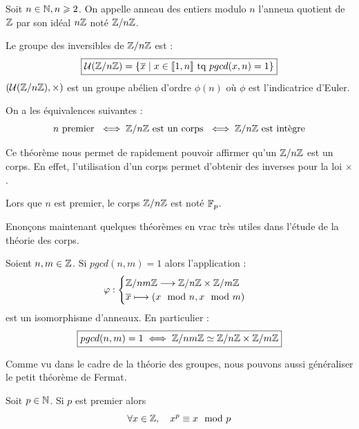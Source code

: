 \begin{definition}[Anneau $\Z / n \Z$]
    Soit $n \in \mathbb{N}, n \geqslant 2$. On appelle anneau des entiers modulo $n$ l'anneua quotient de $\mathbb{Z}$ 
    par son idéal $n\mathbb{Z}$ noté $\Z /n \Z$. 
\end{definition}

\begin{theorem}
    Le groupe des inversibles de $\Z / n \Z$ est : 
        \[ \boxed{ \mathcal{U}(\mathbb{Z} / n \mathbb{Z}) = \{ \overline{x} \; | \; x \in \llbracket 1, n \rrbracket \text{ tq } pgcd(x,n) = 1\} } \] 
    $(\mathcal{U}(\mathbb{Z} / n \mathbb{Z}), \times)$ est un groupe abélien d'ordre $\phi(n)$ où $\phi$ est l'indicatrice d'Euler. 
\end{theorem}

\begin{theorem}[Fondamental]
    On a les équivalences suivantes : 
        \[ n \text{ premier } \iff \mathbb{Z} / n \mathbb{Z} \text{ est un corps } \iff \mathbb{Z} / n \mathbb{Z} \text{ est intègre} \] 
\end{theorem}

Ce théorème nous permet de rapidement pouvoir affirmer qu'un $\Z/n\Z$ est un corps. 
En effet, l'utilisation d'un corps permet d'obtenir des inverses pour la loi $\times$. 

\begin{remark}[Notation]
    Lors que $n$ est premier, le corps $\Z / n \Z$ est noté $\mathbb{F}_p$. 
\end{remark}

Enonçons maintenant quelques théorèmes en vrac très utiles dans l'étude de la théorie des corps. 

\begin{theorem}
    Soient $n,m \in \mathbb{Z}$. Si $ pgcd(n,m) = 1$ alors l'application : 
        \[ \varphi : 
            \begin{cases}
                \mathbb{Z} /nm \mathbb{Z} \longrightarrow \mathbb{Z} /n \mathbb{Z} \times \mathbb{Z} / m \mathbb{Z} \\ 
                \overline{x} \longmapsto (x \mod n, x \mod m)
            \end{cases} \] 
    est un isomorphisme d'anneaux. En particulier : 
        \[ \boxed{ pgcd(n,m) = 1 \iff \mathbb{Z} /nm \mathbb{Z} \simeq \mathbb{Z} /n \mathbb{Z} \times \mathbb{Z} / m \mathbb{Z}  } \]
\end{theorem}

Comme vu dans le cadre de la théorie des groupes, nous pouvons aussi généraliser le petit théorème de Fermat. 

\begin{theorem}
    Soit $ p \in \mathbb{N}$. Si $p$ est premier alors 
        \[ \forall x \in \mathbb{Z}, \quad x^p \equiv x \mod p \] 
\end{theorem}

